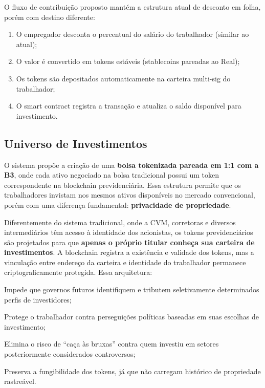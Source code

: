 O fluxo de contribuição proposto mantém a estrutura atual de desconto em folha, porém com destino diferente:

\begin{enumerate}
    \item O empregador desconta o percentual do salário do trabalhador (similar ao atual);
    \item O valor é convertido em tokens estáveis (stablecoins pareadas ao Real);
    \item Os tokens são depositados automaticamente na carteira multi-sig do trabalhador;
    \item O smart contract registra a transação e atualiza o saldo disponível para investimento.
\end{enumerate}

\subsection{Universo de Investimentos}
\label{sec:universo-investimentos}

O sistema propõe a criação de uma \textbf{bolsa tokenizada pareada em 1:1 com a B3}, onde cada ativo negociado na bolsa tradicional possui um token correspondente na blockchain previdenciária. Essa estrutura permite que os trabalhadores invistam nos mesmos ativos disponíveis no mercado convencional, porém com uma diferença fundamental: \textbf{privacidade de propriedade}.

Diferentemente do sistema tradicional, onde a CVM, corretoras e diversos intermediários têm acesso à identidade dos acionistas, os tokens previdenciários são projetados para que \textbf{apenas o próprio titular conheça sua carteira de investimentos}. A blockchain registra a existência e validade dos tokens, mas a vinculação entre endereço da carteira e identidade do trabalhador permanece criptograficamente protegida. Essa arquitetura:

\begin{alineas}
    \item Impede que governos futuros identifiquem e tributem seletivamente determinados perfis de investidores;
    \item Protege o trabalhador contra perseguições políticas baseadas em suas escolhas de investimento;
    \item Elimina o risco de ``caça às bruxas'' contra quem investiu em setores posteriormente considerados controversos;
    \item Preserva a fungibilidade dos tokens, já que não carregam histórico de propriedade rastreável.
\end{alineas}

